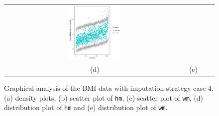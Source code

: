 \documentclass[12pt, fullpage, a4paper]{article}
\begin{document}
\begin{figure} [ht!]
\begin{tabular}{cccc}
		\includegraphics[width=0.3\textwidth]{plots/distributioncase4wm} \\
		\textnormal{(d)}  & \textnormal{(e)}  \\[6pt]
	\end{tabular}
	\caption{Graphical analysis of the BMI data with imputation strategy case 4. (a) density plots, (b) scatter plot of \texttt{hm}, (c) scatter plot of \texttt{wm}, (d) distribution plot of \texttt{hm} and (e) distribution plot of \texttt{wm}.}
	\label{fig6_12}
\end{figure}
\end{document}
